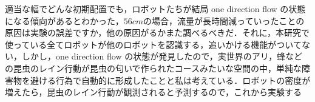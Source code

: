 適当な幅でどんな初期配置でも，ロボットたちが結局 one direction flow の状態になる傾向があるとわかった，$56cm$の場合，流量が長時間減っていったことの原因は実験の誤差ですか，他の原因がるかまた調べるべきだ．それに，本研究で使っている全てロボットが他のロボットを認識する，追いかける機能がついてない，しかし，one direction flow の状態が発見したので，実世界のアリ，蜂などの昆虫のレイン行動が昆虫の匂いで作られたコースみたいな空間の中，単純な障害物を避ける行為で自動的に形成したことと私は考えている．ロボットの密度が増えたら，昆虫のレイン行動が観測されると予測するので，これから実験する
